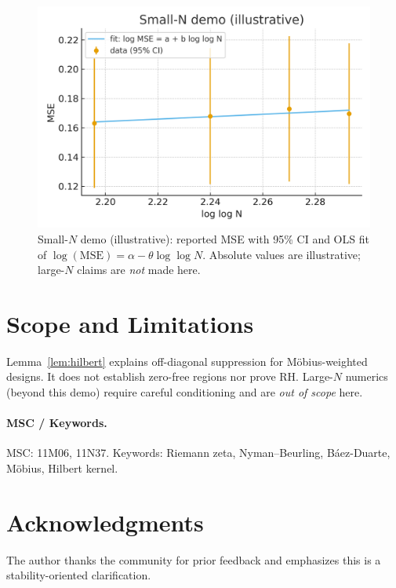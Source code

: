 \documentclass[11pt]{article}
\theoremstyle{remark}
\begin{document}
\begin{figure}[t]
\centering
\includegraphics[width=0.8\linewidth]{figures/scaling_smallN.png}
\caption{Small-$N$ demo (illustrative): reported MSE with 95\% CI and OLS fit of $\log(\mathrm{MSE})=\alpha-\theta\log\log N$.
Absolute values are illustrative; large-$N$ claims are \emph{not} made here.}
\label{fig:smallN}
\end{figure}

\section{Scope and Limitations}
Lemma~\ref{lem:hilbert} explains off-diagonal suppression for M\"obius-weighted designs.
It does not establish zero-free regions nor prove RH.
Large-$N$ numerics (beyond this demo) require careful conditioning and are \emph{out of scope} here.

\paragraph{MSC / Keywords.}
MSC: 11M06, 11N37. Keywords: Riemann zeta, Nyman--Beurling, Báez-Duarte, M\"obius, Hilbert kernel.

\section*{Acknowledgments}
The author thanks the community for prior feedback and emphasizes this is a stability-oriented clarification.



\end{document}
